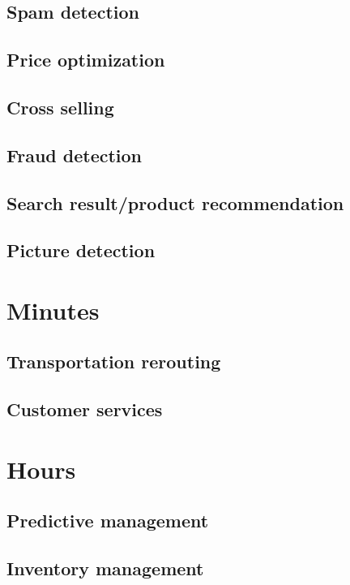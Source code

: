 \subsection{Spam detection}

\subsection{Price optimization}

\subsection{Cross selling}


\subsection{Fraud detection}

\subsection{Search result/product recommendation}


\subsection{Picture detection}

\section{Minutes}


\subsection{Transportation rerouting}


\subsection{Customer services}


\section{Hours}




\subsection{Predictive management}

\subsection{Inventory management}

